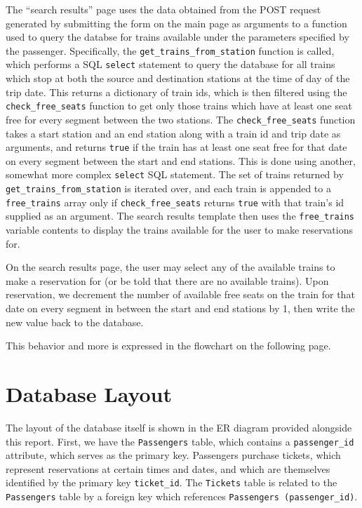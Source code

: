 \documentclass{article}
\begin{document}
The ``search results'' page uses the data obtained from the POST request generated by submitting the form on the main page as arguments to a function used to query the databse for trains available under the parameters specified by the passenger. Specifically, the \texttt{get\_trains\_from\_station} function is called, which performs a SQL \texttt{select} statement to query the database for all trains which stop at both the source and destination stations at the time of day of the trip date. This returns a dictionary of train ids, which is then filtered using the \texttt{check\_free\_seats} function to get only those trains which have at least one seat free for every segment between the two stations. The \texttt{check\_free\_seats} function takes a start station and an end station along with a train id and trip date as arguments, and returns \texttt{true} if the train has at least one seat free for that date on every segment between the start and end stations. This is done using another, somewhat more complex \texttt{select} SQL statement. The set of trains returned by \texttt{get\_trains\_from\_station} is iterated over, and each train is appended to a \texttt{free\_trains} array only if \texttt{check\_free\_seats} returns \texttt{true} with that train's id supplied as an argument. The search results template then uses the \texttt{free\_trains} variable contents to display the trains available for the user to make reservations for.

On the search results page, the user may select any of the available trains to make a reservation for (or be told that there are no available trains). Upon reservation, we decrement the number of available free seats on the train for that date on every segment in between the start and end stations by 1, then write the new value back to the database.

This behavior and more is expressed in the flowchart on the following page.



\section{Database Layout}

The layout of the database itself is shown in the ER diagram provided alongside this report. First, we have the \texttt{Passengers} table, which contains a \texttt{passenger\_id} attribute, which serves as the primary key. Passengers purchase tickets, which represent reservations at certain times and dates, and which are themselves identified by the primary key \texttt{ticket\_id}. The \texttt{Tickets} table is related to the \texttt{Passengers} table by a foreign key which references \texttt{Passengers (passenger\_id)}.
\end{document}
